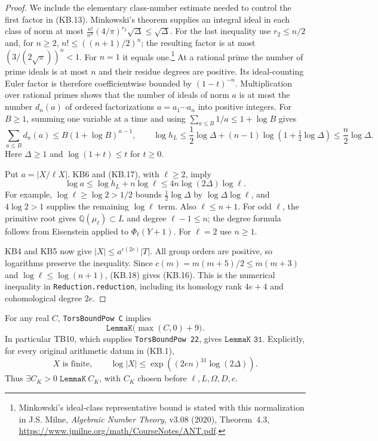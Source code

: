 \begin{proof}
We include the elementary class-number estimate needed to control
the first factor in (KB.13).  Minkowski's theorem supplies an
integral ideal in each class of norm at most
$\frac{n!}{n^n}(4/\pi)^{r_2}\sqrt\Delta\le\sqrt\Delta$.
For the last inequality use $r_2\le n/2$ and, for $n\ge2$,
$n!\le((n+1)/2)^n$; the resulting factor is at most
$(3/(2\sqrt\pi))^n<1$.  For $n=1$ it equals one.\footnote{
Minkowski's ideal-class representative bound is stated with this
normalization in J.S. Milne, \emph{Algebraic Number Theory},
v3.08 (2020), Theorem~4.3,
\url{https://www.jmilne.org/math/CourseNotes/ANT.pdf}.}
At a rational prime the number of prime ideals is at most $n$ and
their residue degrees are positive.  Its ideal-counting Euler
factor is therefore coefficientwise bounded by $(1-t)^{-n}$.
Multiplication over rational primes shows that the number of
ideals of norm $a$ is at most the number $d_n(a)$ of ordered
factorizations $a=a_1\cdots a_n$ into positive integers.
For $B\ge1$, summing one variable at a time and using
$\sum_{a\le B}1/a\le1+\log B$ gives
\[
 \sum_{a\le B}d_n(a)\le B(1+\log B)^{n-1},\qquad
 \log h_L\le\frac12\log\Delta
 +(n-1)\log(1+\tfrac12\log\Delta)
 \le\frac n2\log\Delta.
 \tag{KB.17}
\]
Here $\Delta\ge1$ and $\log(1+t)\le t$ for $t\ge0$.

Put $a=|X/\ell X|$.  KB6 and (KB.17), with $\ell\ge2$, imply
\[
 \log a\le\log h_L+n\log\ell
                  \le4n\log(2\Delta)\log\ell.
 \tag{KB.18}
\]
For example, $\log\ell\ge\log2>1/2$ bounds
$\tfrac12\log\Delta$ by $\log\Delta\log\ell$, and
$4\log2>1$ supplies the remaining $\log\ell$ term.
Also $\ell\le n+1$.  For odd $\ell$, the primitive root gives
$\mathbb Q(\mu_\ell)\subset L$ and degree $\ell-1\le n$;
the degree formula follows from Eisenstein applied to
$\Phi_\ell(Y+1)$.  For $\ell=2$ use $n\ge1$.

KB4 and KB5 now give
$|X|\le a^{c(2e)}|T|$.  All group orders are positive, so
logarithms preserve the inequality.  Since
$c(m)=m(m+5)/2\le m(m+3)$ and
$\log\ell\le\log(n+1)$, (KB.18) gives (KB.16).
This is the numerical inequality in \texttt{Reduction.reduction},
including its homology rank $4e+4$ and cohomological degree $2e$.
\end{proof}

\begin{proposition}
\label{claim:KB8}
For any real $C$, \texttt{TorsBoundPow C} implies
\[
              \texttt{LemmaK}\bigl(\max(C,0)+9\bigr).
 \tag{KB.19}
\]
In particular TB10, which supplies \texttt{TorsBoundPow 22}, gives
$\texttt{LemmaK 31}$.  Explicitly, for every original arithmetic
datum in (KB.1),
\[
 X\text{ is finite},\qquad
 \log|X|\le
       \exp\!\left((2en)^{31}\log(2\Delta)\right).
 \tag{KB.20}
\]
Thus $\exists C_K>0\;\texttt{LemmaK}\ C_K$, with $C_K$ chosen
before $\ell,L,\Omega,D,e$.
\end{proposition}

